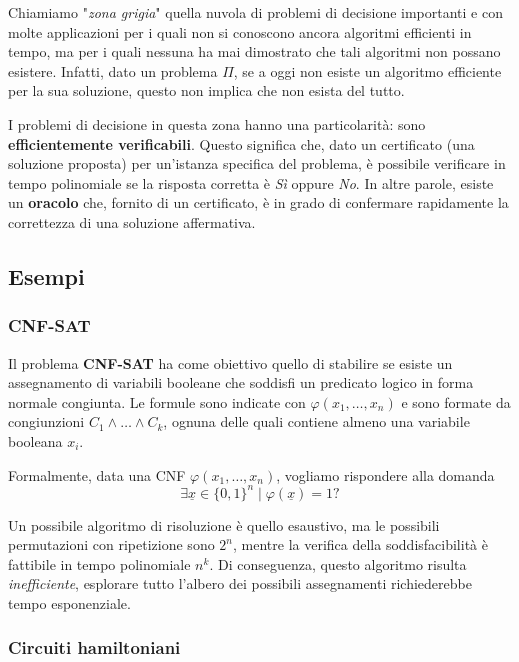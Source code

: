 Chiamiamo "\textit{zona grigia}" quella nuvola di problemi di decisione importanti e con molte applicazioni per i quali non si conoscono ancora algoritmi efficienti in tempo, ma per i quali nessuna ha mai dimostrato che tali algoritmi non possano esistere. Infatti, dato un problema $\Pi$, se a oggi non esiste un algoritmo efficiente per la sua soluzione, questo non implica che non esista del tutto.

I problemi di decisione in questa zona hanno una particolarità: sono \textbf{efficientemente verificabili}. Questo significa che, dato un certificato (una soluzione proposta) per un'istanza specifica del problema, è possibile verificare in tempo polinomiale se la risposta corretta è \textit{Sì} oppure \textit{No}. In altre parole, esiste un \textbf{oracolo} che, fornito di un certificato, è in grado di confermare rapidamente la correttezza di una soluzione affermativa.

\subsection{Esempi}

\subsubsection{CNF-SAT}

Il problema \textbf{CNF-SAT} ha come obiettivo quello di stabilire se esiste un assegnamento di variabili booleane che soddisfi un predicato logico in forma normale congiunta. Le formule sono indicate con $\varphi (x_1, \dots, x_n)$ e sono formate da congiunzioni $C_1 \wedge \dots \wedge C_k$, ognuna delle quali contiene almeno una variabile booleana $x_i$.

Formalmente, data una CNF $\varphi(x_1, \dots, x_n)$, vogliamo rispondere alla domanda
$$ \exists \underline{x} \in \{0,1\}^n \mid \varphi(\underline{x}) = 1 ?$$

Un possibile algoritmo di risoluzione è quello esaustivo, ma le possibili permutazioni con ripetizione sono $2^n$, mentre la verifica della soddisfacibilità è fattibile in tempo polinomiale $n^k$. Di conseguenza, questo algoritmo risulta \textit{inefficiente}, esplorare tutto l'albero dei possibili assegnamenti richiederebbe tempo esponenziale.

\subsubsection{Circuiti hamiltoniani}

